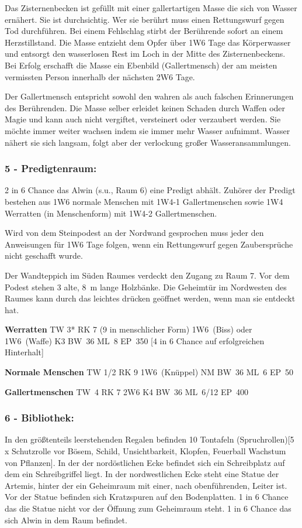
Das Zisternenbecken ist
gefüllt mit einer gallertartigen Masse die sich von Wasser ernähert. Sie
ist durchsichtig. Wer sie berührt muss einen Rettungswurf gegen Tod
durchführen. Bei einem Fehlschlag stirbt der Berührende sofort an
einem Herzstillstand. Die Masse entzieht dem Opfer über 1W6 Tage das
Körperwasser und entsorgt den wasserlosen Rest im Loch in der Mitte
des Zisternenbeckens. Bei Erfolg erschafft die Masse ein Ebenbild
(Gallertmensch) der am meisten vermissten Person innerhalb der nächsten
2W6 Tage.

Der Gallertmensch entspricht sowohl den wahren als auch falschen
Erinnerungen des Berührenden.  Die Masse selber erleidet keinen Schaden
durch Waffen oder Magie und kann auch nicht vergiftet, versteinert oder
verzaubert werden. Sie möchte immer weiter wachsen indem sie immer
mehr Wasser aufnimmt. Wasser nähert sie sich langsam, folgt aber der
verlockung großer Wasseransammlungen.

\subsubsection{5 - Predigtenraum:} 2 in 6 Chance das Alwin (s.u., Raum 6)
eine Predigt abhält. Zuhörer
der Predigt bestehen aus 1W6 normale Menschen mit 1W4-1 Gallertmenschen
sowie 1W4 Werratten (in Menschenform) mit 1W4-2 Gallertmenschen.

Wird von
dem Steinpodest an der Nordwand gesprochen muss jeder den Anweisungen
für 1W6 Tage folgen, wenn ein Rettungswurf gegen Zaubersprüche nicht
geschafft wurde.

Der Wandteppich im Süden Raumes verdeckt den Zugang
zu Raum 7. Vor dem Podest stehen 3 alte, 8~m lange Holzbänke. Die
Geheimtür im Nordwesten des Raumes kann durch das leichtes drücken
geöffnet werden, wenn man sie entdeckt hat.

\textbf{Werratten} TW 3* RK 7 (9
in menschlicher Form) 1W6~(Biss) oder 1W6~(Waffe) K3 BW~36 ML~8 EP~350
[4 in 6 Chance auf erfolgreichen Hinterhalt]

\textbf{Normale Menschen} TW 1/2 RK 9 1W6~(Knüppel) NM BW~36 ML~6 EP~50

\textbf{Gallertmenschen} TW~4 RK 7 2W6 K4 BW~36 ML~6/12 EP~400

\subsubsection{6 - Bibliothek:} In den größtenteils leerstehenden Regalen befinden
10 Tontafeln (Spruchrollen)[5 x Schutzrolle vor Bösem, Schild,
Unsichtbarkeit, Klopfen, Feuerball Wachstum von Pflanzen]. In der
der nordöstlichen Ecke befindet sich ein Schreibplatz auf dem ein
Schreibgriffel liegt. In der nordwestlichen Ecke steht eine Statue der
Artemis, hinter der ein Geheimraum mit einer, nach obenführenden, Leiter
ist. Vor der Statue befinden sich Kratzspuren auf den Bodenplatten. 1 in
6 Chance das die Statue nicht vor der Öffnung zum Geheimraum steht. 1
in 6 Chance das sich Alwin in dem Raum befindet.

